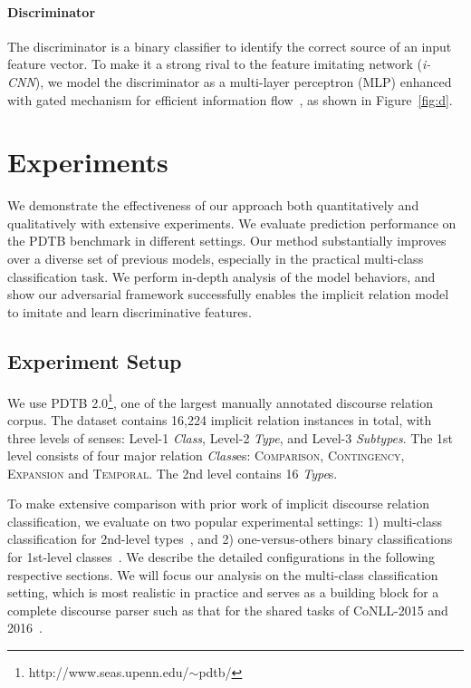 \documentclass[11pt,a4paper]{article}
\begin{document}
\paragraph{Discriminator}\label{sec:disc}
The discriminator is a binary classifier to identify the correct source of an input feature vector. To make it a strong rival to the feature imitating network ({\it i-CNN}), we model the discriminator as a multi-layer perceptron (MLP) enhanced with gated mechanism for efficient information flow~\cite{srivastava2015highway,qin2016stacking}, as shown in Figure~\ref{fig:d}.


\section{Experiments}\label{sec:exp}
%
We demonstrate the effectiveness of our approach both quantitatively and qualitatively with extensive experiments. We evaluate prediction performance on the PDTB benchmark in different settings. Our method substantially improves over a diverse set of previous models, especially in the practical multi-class classification task. We perform in-depth analysis of the model behaviors, and show our adversarial framework successfully enables the implicit relation model to imitate and learn discriminative features.

\subsection{Experiment Setup}\label{sec:setup}
We use PDTB 2.0\footnote{http://www.seas.upenn.edu/$\sim$pdtb/}, one of the largest manually annotated discourse relation corpus. The dataset contains 16,224 implicit relation instances in total, with three levels of senses: Level-1 \textit{Class}, Level-2 \textit{Type}, and Level-3 \textit{Subtypes}. The 1st level consists of four major relation \textit{Class}es: \textsc{Comparison}, \textsc{Contingency}, \textsc{Expansion} and \textsc{Temporal}. The 2nd level contains 16 \textit{Type}s.

To make extensive comparison with prior work of implicit discourse relation classification, we evaluate on two popular experimental settings: 1) multi-class classification for 2nd-level types~\cite{lin2009recognizing,ji2015one}, 
and 2) one-versus-others binary classifications for 1st-level classes~\cite{pitler-louis-nenkova:2009:ACLIJCNLP}. We describe the detailed configurations in the following respective sections. We will focus our analysis on the multi-class classification setting, which is most realistic in practice and serves as a building block for a complete discourse parser such as that for the shared tasks of CoNLL-2015 and 2016~\cite{xue2015conll,xue-EtAl:2016:CoNLL-ST}.
\end{document}
